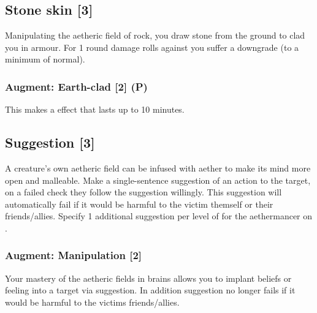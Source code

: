 \subsection{Stone skin [3]}
Manipulating the aetheric field of rock, you draw stone from the ground to clad you in armour. For 1 round damage rolls against you suffer a  downgrade (to a minimum of normal). 
\subsubsection{Augment: Earth-clad [2] (P)}
This makes  a  effect that lasts up to 10 minutes.


\subsection{Suggestion [3]}
A creature's own aetheric field can be infused with aether to make its mind more open and malleable. Make a single-sentence suggestion of an action to the target, on a failed  check they follow the suggestion willingly. This suggestion will automatically fail if it would
be harmful to the victim themself or their friends/allies. Specify 1 additional suggestion per level of  for the aethermancer on . 		
\subsubsection{Augment: Manipulation [2]}
Your mastery of the aetheric fields in brains allows you to implant beliefs or feeling into a target via suggestion. In addition suggestion no longer fails if it would be harmful to the victims friends/allies.




